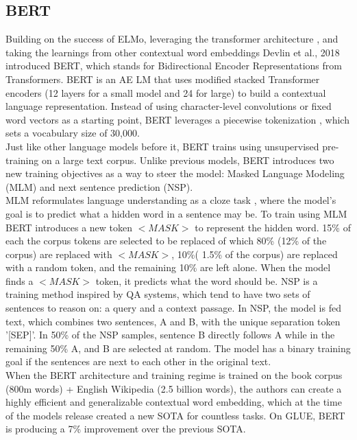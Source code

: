 \subsection{BERT}
\label{Bchap:prior:sec:lm:bert}
Building on the success of ELMo, leveraging the transformer architecture \cite{Vaswani2017AttentionIA}, and taking the learnings from other contextual word embeddings \cite{Howard2018UniversalLM} \cite{Radford2018ImprovingLU} Devlin et al., 2018 introduced BERT, which stands for Bidirectional Encoder Representations from Transformers. BERT is an AE LM that uses modified stacked Transformer encoders (12 layers for a small model and 24 for large) to build a contextual language representation. Instead of using character-level convolutions or fixed word vectors as a starting point, BERT leverages a piecewise tokenization \cite{Wu2016GooglesNM}, which sets a vocabulary size of 30,000.  \\
Just like other language models before it, BERT trains using unsupervised pre-training on a large text corpus. Unlike previous models, BERT introduces two new training objectives as a way to steer the model: Masked Language Modeling (MLM) and next sentence prediction (NSP). \\
MLM reformulates language understanding as a cloze task \cite{Taylor1953ClozePA}, where the model's goal is to predict what a hidden word in a sentence may be. To train using MLM BERT introduces a new token $<MASK>$ to represent the hidden word. 15\% of each the corpus tokens are selected to be replaced of which 80\% (12\% of the corpus) are replaced with $<MASK>$, 10\%( 1.5\% of the corpus) are replaced with a random token, and the remaining 10\% are left alone. When the model finds a $<MASK>$ token, it predicts what the word should be. NSP is a training method inspired by QA systems, which tend to have two sets of sentences to reason on: a query and a context passage. In NSP, the model is fed text, which combines two sentences, A and B, with the unique separation token '[SEP]'. In 50\% of the NSP samples, sentence B directly follows A while in the remaining 50\% A, and B are selected at random. The model has a binary training goal if the sentences are next to each other in the original text.\\
When the BERT architecture and training regime is trained on the book corpus (800m words) + English Wikipedia (2.5 billion words), the authors can create a highly efficient and generalizable contextual word embedding, which at the time of the models release created a new SOTA for countless tasks. On GLUE, BERT is producing a 7\% improvement over the previous SOTA. 
